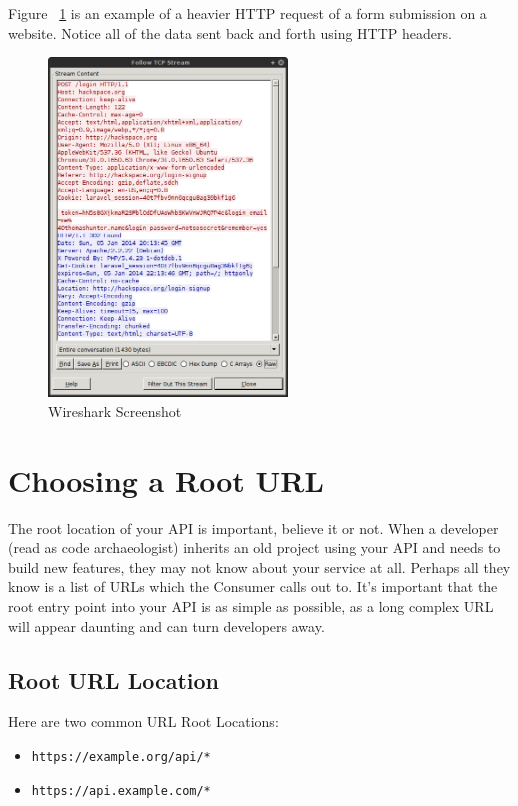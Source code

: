 \documentclass{book}
\begin{document}
Figure ~\ref{fig:wireshark} is an example of a heavier HTTP request of a form submission on a website. Notice all of the data sent back and forth using HTTP headers.

\begin{figure}[ht!]
\centering
\includegraphics[height=90mm]{images/wireshark.png}
\caption{Wireshark Screenshot}
\label{fig:wireshark}
\end{figure}


\section{Choosing a Root URL}

The root location of your API is important, believe it or not. When a developer (read as code archaeologist) inherits an old project using your API and needs to build new features, they may not know about your service at all. Perhaps all they know is a list of URLs which the Consumer calls out to. It's important that the root entry point into your API is as simple as possible, as a long complex URL will appear daunting and can turn developers away.

\subsection{Root URL Location}

Here are two common URL Root Locations:

\begin{itemize}
\item \texttt{https://example.org/api/*}
\item \texttt{https://api.example.com/*}
\end{itemize}
\end{document}

